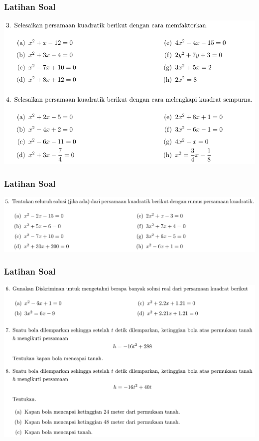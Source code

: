 \documentclass[pdflatex,compress,mathserif]{beamer}
\begin{document}
\begin{frame}
	\frametitle{Latihan Soal}
	\begin{center}
		\includegraphics[width=\linewidth]{img/img33}
	\end{center}
\end{frame}

\begin{frame}
	\frametitle{Latihan Soal}
	\begin{center}
		\includegraphics[width=\linewidth]{img/img34}
	\end{center}
\end{frame}

\begin{frame}
	\frametitle{Latihan Soal}
	\begin{center}
		\includegraphics[width=\linewidth]{img/img35}
	\end{center}
\end{frame}
\end{document}

